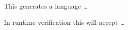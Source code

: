 			
			
			
			This generates a language \dots %
				
			In runtime verification this will accept \dots %
				
			
		
			
			
			
				
